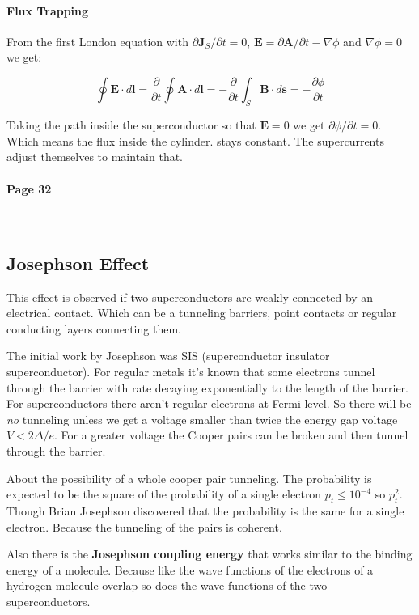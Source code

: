 \documentclass[12pt]{article}
\numberwithin{equation}{subsection}
\newcommand\page[1]{
{
\color{blue}\paragraph{
Page #1
}\mbox{}\\
}
}
\begin{document}
\paragraph{Flux Trapping\\}
From the first London equation with $\partial\mathbf J_S/\partial t = 0 $, $\mathbf E=\partial\mathbf A/\partial t - \nabla \phi$ and $\nabla \phi = 0$ we get:

\begin{equation}
    \oint \mathbf E \cdot d\mathbf l = \frac{\partial}{\partial t} \oint \mathbf A \cdot d \mathbf l = -\frac{\partial}{\partial t} \int_S \mathbf B \cdot d \mathbf s = - \frac{\partial \phi}{\partial t}  
\end{equation}

Taking the path inside the superconductor so that $\mathbf E = 0$ we get $\partial \phi /\partial t = 0$. Which means the flux inside the cylinder.
stays constant. The supercurrents adjust themselves to maintain that.

\page{32}

\subsection{Josephson Effect}

This effect is observed if two superconductors are weakly connected by an electrical contact. Which can be a tunneling barriers, point contacts or regular conducting layers connecting them. 

The initial work by Josephson was SIS (superconductor insulator superconductor). For regular metals it's known that some electrons tunnel through the barrier with rate decaying exponentially to the length of the barrier. For superconductors there aren't regular electrons at Fermi level. So there will be \emph{no} tunneling unless we get a voltage smaller than twice the energy gap voltage $V<2\Delta /e$. For a greater voltage the Cooper pairs can be broken and then tunnel through the barrier.

About the possibility of a whole cooper pair tunneling. The probability is expected to be the square of the probability of a single electron $p_t\le 10^{-4}$ so $p_t^2$. Though Brian Josephson discovered that the probability is the same for a single electron. Because the tunneling of the pairs is coherent.

Also there is the \textbf{Josephson coupling energy} that works similar to the binding energy of a molecule. Because like the wave functions of the electrons of a hydrogen molecule overlap so does the wave functions of the two superconductors.
\end{document}
